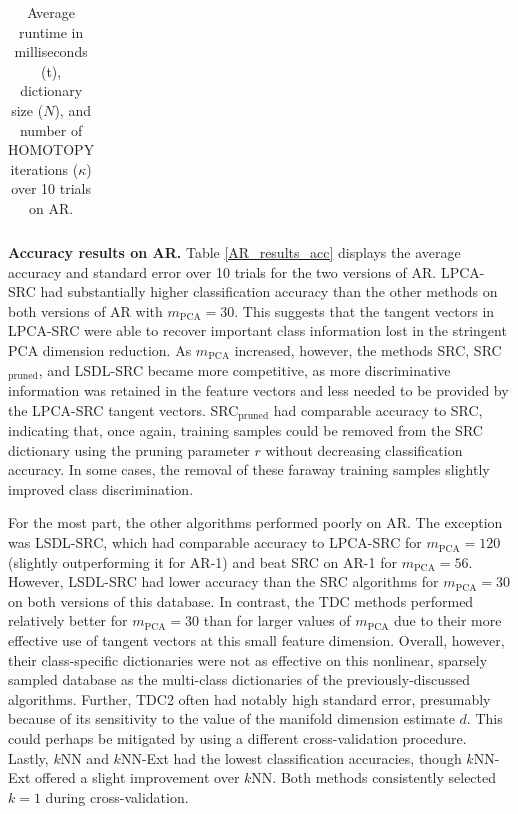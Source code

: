 \documentclass[review]{elsarticle}
\begin{document}
\begin{table}[!htb]
{\begin{tabular}{|c|r|r|c|r|r|c|r|r|c|}
\hline
\end{tabular}
\caption{Average runtime in milliseconds (t), dictionary size ($N$), and number of HOMOTOPY iterations ($\kappa$) over 10 trials on AR.} 
\label{AR_results_time}}
\end{table}


\textbf{Accuracy results on AR.} Table \ref{AR_results_acc} displays the average accuracy and standard error over 10 trials for the two versions of AR. LPCA-SRC had substantially higher classification accuracy than the other methods on both versions of AR with $m_\mathrm{PCA} = 30$. This suggests that the tangent vectors in LPCA-SRC were able to recover important class information lost in the stringent PCA dimension reduction. As $m_\mathrm{PCA}$ increased, however, the methods SRC, SRC$_\mathrm{pruned}$, and LSDL-SRC became more competitive, as more discriminative information was retained in the feature vectors and less needed to be provided by the LPCA-SRC tangent vectors. SRC$_\mathrm{pruned}$ had comparable accuracy to SRC, indicating that, once again, training samples could be removed from the SRC dictionary using the pruning parameter $r$ without decreasing classification accuracy. In some cases, the removal of these faraway training samples slightly improved class discrimination.

For the most part, the other algorithms performed poorly on AR. The exception was LSDL-SRC, which had comparable accuracy to LPCA-SRC for $m_\mathrm{PCA} = 120$ (slightly outperforming it for AR-1) and beat SRC on AR-1 for $m_\mathrm{PCA} = 56$. However, LSDL-SRC had lower accuracy than the SRC algorithms for $m_\mathrm{PCA} = 30$ on both versions of this database. In contrast, the TDC methods performed relatively better for $m_\mathrm{PCA}=30$ than for larger values of $m_\mathrm{PCA}$ due to their more effective use of tangent vectors at this small feature dimension. Overall, however, their class-specific dictionaries were not as effective on this nonlinear, sparsely sampled database as the multi-class dictionaries of the previously-discussed algorithms. Further, TDC2 often had notably high standard error, presumably because of its sensitivity to the value of the manifold dimension estimate $d$. This could perhaps be mitigated by using a different cross-validation procedure. Lastly, $k$NN and $k$NN-Ext had the lowest classification accuracies, though $k$NN-Ext offered a slight improvement over $k$NN. Both methods consistently selected $k=1$ during cross-validation.
\end{document}
